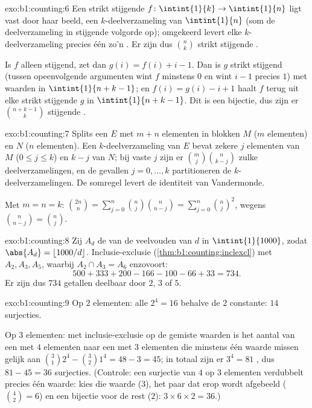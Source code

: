 \begin{solution}{exo:b1:counting:6}
Een strikt stijgende  $f \colon \intint{1}{k} \to
\intint{1}{n}$ ligt vast door haar beeld, een $k$-deelverzameling van
$\intint{1}{n}$ (som de deelverzameling in stijgende volgorde op);
omgekeerd levert elke $k$-deelverzameling precies één zo'n .
Er zijn dus $\binom nk$ strikt stijgende .

Is $f$ alleen stijgend, zet dan $g(i) = f(i) + i - 1$. Dan is $g$ strikt
stijgend (tussen opeenvolgende argumenten wint $f$ minstens $0$ en wint
$i - 1$ precies $1$) met waarden in $\intint{1}{n + k - 1}$; en $f(i) =
g(i) - i + 1$ haalt $f$ terug uit elke strikt stijgende $g$ in
$\intint{1}{n+k-1}$. Dit is een bijectie, dus zijn er $\binom{n + k -
1}{k}$ stijgende .
\end{solution}

\begin{solution}{exo:b1:counting:7}
Splits een  $E$ met $m + n$ elementen in blokken $M$ ($m$
elementen) en $N$ ($n$ elementen). Een $k$-deelverzameling van $E$ bevat
zekere $j$ elementen van $M$ ($0 \leq j \leq k$) en $k - j$ van $N$; bij
vaste $j$ zijn er $\binom mj \binom{n}{k-j}$ zulke deelverzamelingen, en
de gevallen $j = 0, \dots, k$ partitioneren de $k$-deelverzamelingen. De
somregel levert de identiteit van
Vandermonde.

Met $m = n = k$: $\binom{2n}{n} = \sum_{j=0}^{n} \binom nj
\binom{n}{n-j} = \sum_{j=0}^{n} \binom nj^2$, wegens $\binom{n}{n-j} =
\binom nj$.
\end{solution}

\begin{solution}{exo:b1:counting:8}
Zij $A_d$ de  van de veelvouden van $d$ in $\intint{1}{1000}$,
zodat $\abs{A_d} = \lfloor 1000/d \rfloor$. Inclusie-exclusie
(\cref{thm:b1:counting:inclexcl}) met $A_2, A_3, A_5$, waarbij $A_2 \cap
A_3 = A_6$ enzovoort:
\[
500 + 333 + 200 - 166 - 100 - 66 + 33 = 734 .
\]
Er zijn dus $734$ getallen deelbaar door $2$, $3$ of $5$.
\end{solution}

\begin{solution}{exo:b1:counting:9}
Op $2$ elementen: alle $2^4 = 16$  behalve de $2$ constante:
$14$ surjecties.

Op $3$ elementen: met inclusie-exclusie op de gemiste waarden is het
aantal  van een  met $4$ elementen naar een met
$3$ elementen die minstens één waarde missen gelijk aan $\binom 31 2^4 -
\binom 32 1^4 = 48 - 3 = 45$; in totaal zijn er $3^4 = 81$ ,
dus $81 - 45 = 36$ surjecties. (Controle: een surjectie van $4$ op $3$
elementen verdubbelt precies één waarde: kies die waarde ($3$), het paar
dat erop wordt afgebeeld ($\binom 42 = 6$) en een bijectie voor de rest
($2$): $3 \times 6 \times 2 = 36$.)
\end{solution}

